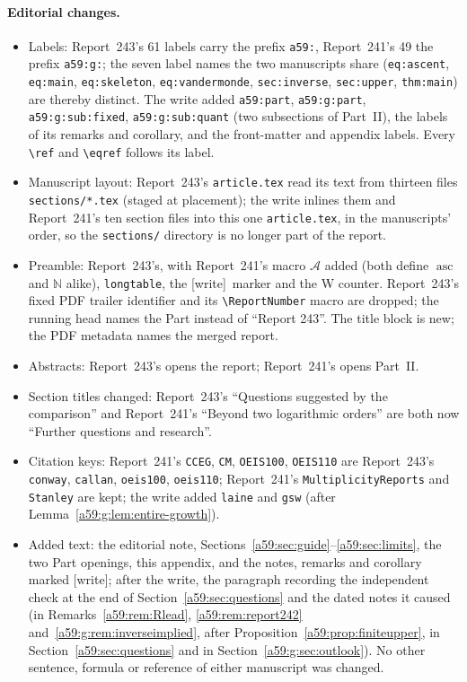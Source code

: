 \documentclass[11pt,letterpaper]{article}
\theoremstyle{remark}\newtheorem{remark}[theorem]{Remark}
\newcommand{\asc}{\operatorname{asc}}\newcommand{\Av}{\operatorname{Av}}\newcommand{\N}{\mathbb N}\newcommand{\E}{\mathbb E}\newcommand{\Prob}{\mathbb P}
\newcommand{\A}{\mathcal A}
\newcommand{\wtag}{\textup{[write]}}
\theoremstyle{remark}\newtheorem{wremark}{Remark}\renewcommand{\thewremark}{W\arabic{wremark}}
\theoremstyle{plain}\newtheorem{wcorollary}[wremark]{Corollary}
\begin{document}
\paragraph{Editorial changes.}
\begin{itemize}
\item Labels: Report~243's 61 labels carry the prefix \texttt{a59:},
Report~241's 49 the prefix \texttt{a59:g:}; the seven label names the two
manuscripts share (\texttt{eq:ascent}, \texttt{eq:main},
\texttt{eq:skeleton}, \texttt{eq:vandermonde}, \texttt{sec:inverse},
\texttt{sec:upper}, \texttt{thm:main}) are thereby distinct. The write added
\texttt{a59:part}, \texttt{a59:g:part}, \texttt{a59:g:sub:fixed},
\texttt{a59:g:sub:quant} (two subsections of Part~II), the labels of its
remarks and corollary, and the front-matter and appendix labels. Every
\verb|\ref| and \verb|\eqref| follows its label.
\item Manuscript layout: Report~243's \texttt{article.tex} read its text from
thirteen files \texttt{sections/*.tex} (staged at placement); the write
inlines them and Report~241's ten section files into this one
\texttt{article.tex}, in the manuscripts' \verb|| order, so the
\texttt{sections/} directory is no longer part of the report.
\item Preamble: Report~243's, with Report~241's macro $\A$ added (both define
$\asc$ and $\N$ alike), \texttt{longtable}, the \wtag\ marker and the W
counter. Report~243's fixed PDF trailer identifier and its
\verb|\ReportNumber| macro are dropped; the running head names the Part
instead of ``Report 243''. The title block is new; the PDF metadata names
the merged report.
\item Abstracts: Report~243's opens the report; Report~241's opens Part~II.
\item Section titles changed: Report~243's ``Questions suggested by the
comparison'' and Report~241's ``Beyond two logarithmic orders'' are both now
``Further questions and research''.
\item Citation keys: Report~241's \texttt{CCEG}, \texttt{CM},
\texttt{OEIS100}, \texttt{OEIS110} are Report~243's \texttt{conway},
\texttt{callan}, \texttt{oeis100}, \texttt{oeis110}; Report~241's
\texttt{MultiplicityReports} and \texttt{Stanley} are kept; the write added
\texttt{laine} and \texttt{gsw} (after Lemma~\ref{a59:g:lem:entire-growth}).
\item Added text: the editorial note, Sections~\ref{a59:sec:guide}--\ref{a59:sec:limits},
the two Part openings, this appendix, and the notes, remarks and corollary
marked \wtag; after the write, the paragraph recording the independent check
at the end of Section~\ref{a59:sec:questions} and the dated notes it caused
(in Remarks~\ref{a59:rem:Rlead}, \ref{a59:rem:report242}
and~\ref{a59:g:rem:inverseimplied}, after Proposition~\ref{a59:prop:finiteupper},
in Section~\ref{a59:sec:questions} and in Section~\ref{a59:g:sec:outlook}). No other sentence, formula or reference of either manuscript
was changed.
\end{itemize}
\end{document}
